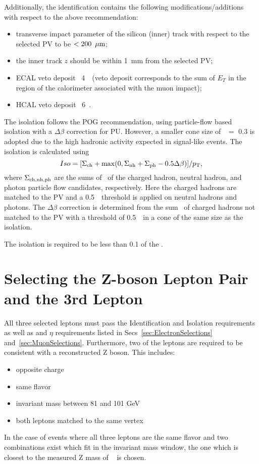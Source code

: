 Additionally, the identification contains the following modifications/additions with respect to the above recommendation:

\begin{itemize}
\item transverse impact parameter of the silicon (inner) track with respect to the selected PV to be $<200~\,\mu\text{m}$;
\item the inner track $z$ should be within 1~mm from the selected PV;
\item ECAL veto deposit \lt\ 4~\GeV\ (veto deposit corresponds to the sum of $E_T$ in the region of the calorimeter
associated with the muon impact);
\item HCAL veto deposit \lt\ 6~\GeV.
\end{itemize}

The isolation follows the POG recommendation, using particle-flow based isolation with a $\Delta\beta$ correction for PU.  
However, a smaller cone size of \DR\ $=$ 0.3 is adopted due to the high hadronic activity expected in signal-like events.  
The isolation is calculated using 
$$
Iso = [ \Sigma_{\rm ch} + {\rm max}(0, \Sigma_{\rm nh} + \Sigma_{\rm ph} - 0.5 \Delta\beta) ]/p_{\mathrm{T}},
$$
where $\Sigma_{\rm ch, nh, ph}$ are the sums of \pt\ of the charged hadron, neutral hadron, and photon particle flow candidates, respectively.
Here the charged hadrons are matched to the PV and a 0.5~\GeV\ threshold is applied on neutral hadrons and photons.  
The $\Delta\beta$ correction is determined from the sum \pt\ of charged hadrons not matched to the PV with a threshold of 0.5~\GeV\ in a cone of the same size as the isolation.  
 
The isolation is required to be less than 0.1 of the \pt.


\section{Selecting the Z-boson Lepton Pair and the 3rd Lepton}
\label{sec:3LepSelection}
All three selected leptons must pass the Identification and Isolation requirements as well as \pt and $\eta$ requirements listed in Secs~\ref{sec:ElectronSelections} and~\ref{sec:MuonSelections}. Furthermore, two of the leptons are required to be consistent with a reconstructed Z boson. This includes:
\begin{itemize}
\item opposite charge
\item same flavor
\item invariant mass between 81 and 101 GeV
\item both leptons matched to the same vertex
\end{itemize}
In the case of events where all three leptons are the same flavor and two combinations exist which fit in the invariant mass window, the one which is closest to the measured Z mass of \zmass ~\cite{pdg} is chosen.\\

